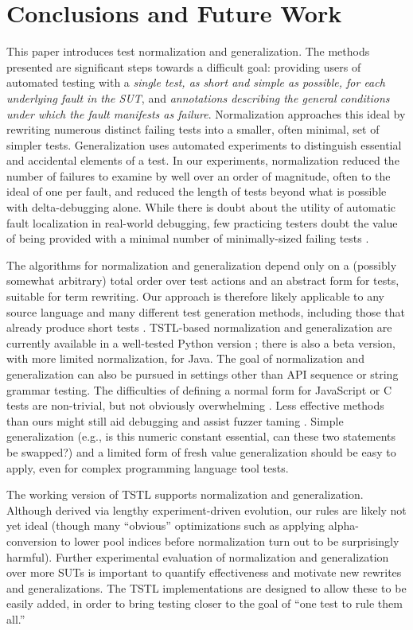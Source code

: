 \section{Conclusions and Future Work}

This paper introduces test normalization and generalization.  The
methods presented are significant steps towards a difficult goal:
providing users of automated testing with a \emph{single test, as
  short and simple as possible, for each underlying fault in the SUT},
and \emph{annotations describing the general conditions under which
  the fault manifests as failure}.  Normalization approaches this
ideal by rewriting numerous distinct failing tests into a smaller,
often minimal, set of simpler tests.  Generalization uses automated
experiments to distinguish essential and accidental elements of a
test.  In our experiments, normalization reduced the number of
failures to examine by well over an order of magnitude, often to the
ideal of one per fault, and reduced the length of tests beyond what is
possible with delta-debugging alone.  While there is doubt about the
utility of automatic fault localization \cite{AutoHelp} in real-world debugging, few practicing testers
doubt the value of being provided with a minimal number of
minimally-sized failing tests \cite{MinUnit,lithium,AMAI}.

The algorithms for normalization and
generalization depend only on a (possibly somewhat arbitrary) total order
over test actions and an abstract form for tests, suitable for term
rewriting.  Our approach is therefore likely applicable to any source language
and many different test generation methods, including those that
already produce short tests \cite{FA11,SoftBET}.  TSTL-based
normalization and generalization are currently available in a
well-tested Python version \cite{tstl,ISSTA15}; there is also a beta version, with more limited
normalization, for Java.
The goal of normalization and generalization can also be pursued in
settings other than API sequence or string grammar testing.  The
difficulties of defining a normal form for JavaScript \cite{jsfunfuzz}
or C \cite{csmith} tests are non-trivial, but not obviously
overwhelming \cite{CReduce}. Less effective methods
than ours might still aid debugging and assist fuzzer taming
\cite{PLDI13}.  Simple generalization (e.g., is this numeric constant
essential, can these two statements be swapped?) and a limited form of
fresh value generalization should be easy to apply, even for complex
programming language tool tests.  

The working version of  TSTL \cite{tstl} supports
normalization and generalization.  Although derived via lengthy experiment-driven
evolution, our rules are likely not yet ideal (though many ``obvious''
optimizations such as applying alpha-conversion to lower pool indices
before normalization turn out to be surprisingly harmful).   Further experimental
evaluation of normalization and generalization over more SUTs is
important to quantify effectiveness and motivate new rewrites and
generalizations.  The TSTL implementations are designed to allow these
to be easily added, in order to bring testing closer to the
goal of ``one test to rule them all.''
